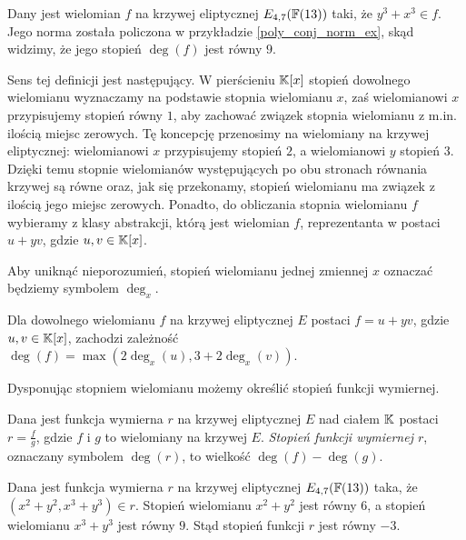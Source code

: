 \begin{example}
Dany jest wielomian $f$ na krzywej eliptycznej $E_{4,7}(\mathbb{F}(13))$ taki,
że $y^3 + x^3 \in f$.
Jego norma została policzona w przykładzie \ref{poly_conj_norm_ex},
skąd widzimy, że jego stopień $\deg(f)$ jest równy $9$.
\end{example}

\noindent
Sens tej definicji jest następujący.
W pierścieniu $\mathbb{K}[x]$ stopień dowolnego wielomianu
wyznaczamy na podstawie stopnia wielomianu $x$,
zaś wielomianowi $x$ przypisujemy stopień równy $1$,
aby zachować związek stopnia wielomianu z m.in. ilością miejsc zerowych.
Tę koncepcję przenosimy na wielomiany na krzywej eliptycznej:
wielomianowi $x$ przypisujemy stopień $2$,
a wielomianowi $y$ stopień $3$.
Dzięki temu stopnie wielomianów
występujących po obu stronach równania krzywej są równe
oraz, jak się przekonamy,
stopień wielomianu ma związek z ilością jego miejsc zerowych.
Ponadto, do obliczania stopnia wielomianu $f$
wybieramy z klasy abstrakcji, którą jest wielomian $f$,
reprezentanta w postaci $u + yv$, gdzie $u, v \in \mathbb{K}[x]$.

\begin{remark}
Aby uniknąć nieporozumień,
stopień wielomianu jednej zmiennej $x$
oznaczać będziemy symbolem $\deg_x$.
\end{remark}

\begin{fact}
Dla dowolnego wielomianu $f$ na krzywej eliptycznej $E$
postaci $f = u + yv$, gdzie $u, v \in \mathbb{K}[x]$,
zachodzi zależność $\deg(f) = \max(2\deg_x(u), 3 + 2\deg_x(v))$.
\end{fact}

\noindent
Dysponując stopniem wielomianu możemy określić stopień funkcji wymiernej.

\begin{definition}
Dana jest funkcja wymierna $r$ na krzywej eliptycznej $E$ nad ciałem $\mathbb{K}$
postaci $r = \frac{f}{g}$,
gdzie $f$ i $g$ to wielomiany na krzywej $E$.
\emph{Stopień funkcji wymiernej $r$},
oznaczany symbolem $\deg(r)$,
to wielkość $\deg(f) - \deg(g)$.
\end{definition}

\begin{example}
Dana jest funkcja wymierna $r$ na krzywej eliptycznej $E_{4,7}(\mathbb{F}(13))$ taka,
że $(x^2 + y^2, x^3 + y^3) \in r$.
Stopień wielomianu $x^2 + y^2$ jest równy $6$,
a stopień wielomianu $x^3 + y^3$ jest równy $9$.
Stąd stopień funkcji $r$ jest równy $-3$.
\end{example}

